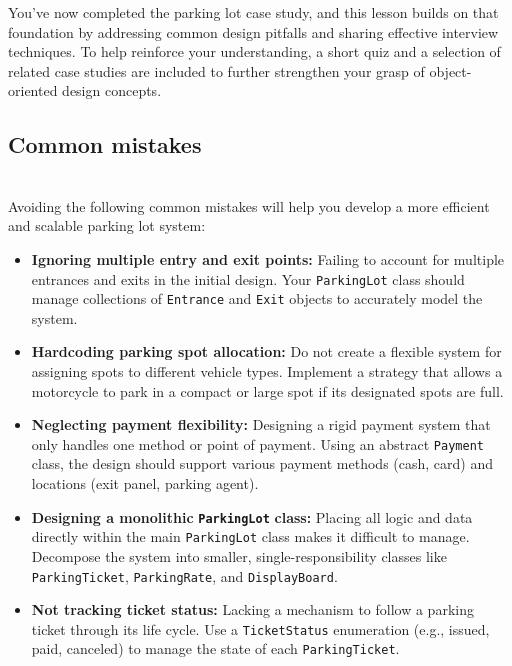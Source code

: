 

You've now completed the parking lot case study, and this lesson builds on that foundation by addressing common design pitfalls and sharing effective interview techniques. To help reinforce your understanding, a short quiz and a selection of related case studies are included to further strengthen your grasp of object-oriented design concepts.

\subsection{Common mistakes}\label{r2gDRfoMdo1Ox8JatwR9Z}
\\
Avoiding the following common mistakes will help you develop a more efficient and scalable parking lot system:

\begin{itemize}
\item
\protect{}\label{feSt-UKhShPFq0bfcClTA}
\textbf{Ignoring multiple entry and exit points:} Failing to account for multiple entrances and exits in the initial design. Your \texttt{ParkingLot} class should manage collections of \texttt{Entrance} and \texttt{Exit} objects to accurately model the system.
\item
\protect{}\label{cG1gEkqr4hRwK4QszdQAx}
\textbf{Hardcoding parking spot allocation:} Do not create a flexible system for assigning spots to different vehicle types. Implement a strategy that allows a motorcycle to park in a compact or large spot if its designated spots are full.
\item
\protect{}\label{vHl-Jf9AbbGXsq-nxCmCO}
\textbf{Neglecting payment flexibility:} Designing a rigid payment system that only handles one method or point of payment. Using an abstract \texttt{Payment} class, the design should support various payment methods (cash, card) and locations (exit panel, parking agent).
\item
\protect{}\label{gDytjHlhTJqXoa2k46vg3}
\textbf{Designing a monolithic} \textbf{\texttt{ParkingLot}} \textbf{class:} Placing all logic and data directly within the main \texttt{ParkingLot} class makes it difficult to manage. Decompose the system into smaller, single-responsibility classes like \texttt{ParkingTicket}, \texttt{ParkingRate}, and \texttt{DisplayBoard}.
\item
\protect{}\label{KTtnYsF6qFi_mUn7KXjOO}
\textbf{Not tracking ticket status:} Lacking a mechanism to follow a parking ticket through its life cycle. Use a \texttt{TicketStatus} enumeration (e.g., issued, paid, canceled) to manage the state of each \texttt{ParkingTicket}.
\end{itemize}

